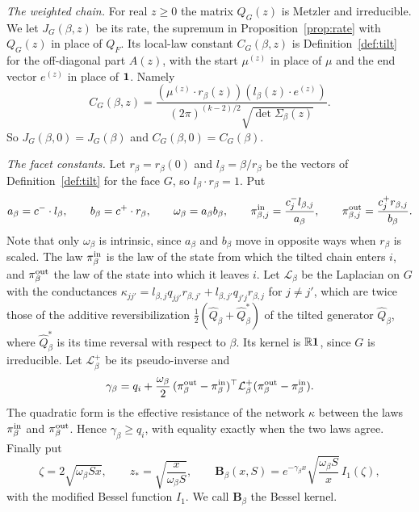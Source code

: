 \emph{The weighted chain.} For real $z\ge0$ the matrix $Q_G(z)$ is Metzler and irreducible.
We let $J_G(\beta,z)$ be its rate, the supremum in Proposition~\ref{prop:rate} with $Q_G(z)$
in place of $Q_F$. Its local-law constant $C_G(\beta,z)$ is Definition~\ref{def:tilt} for the
off-diagonal part $A(z)$, with the start $\mu^{(z)}$ in place of $\mu$ and the end vector
$e^{(z)}$ in place of $\mathbf{1}$. Namely
\[
C_G(\beta,z)=\frac{(\mu^{(z)}\cdot r_\beta(z))(l_\beta(z)\cdot e^{(z)})}{(2\pi)^{(k-2)/2}\sqrt{\det\Sigma_\beta(z)}} .
\]
So $J_G(\beta,0)=J_G(\beta)$ and $C_G(\beta,0)=C_G(\beta)$.

\emph{The facet constants.} Let $r_\beta=r_\beta(0)$ and $l_\beta=\beta/r_\beta$ be the vectors
of Definition~\ref{def:tilt} for the face $G$, so $l_\beta\cdot r_\beta=1$. Put
\[
a_\beta=c^-\cdot l_\beta,\qquad b_\beta=c^+\cdot r_\beta,\qquad \omega_\beta=a_\beta b_\beta,\qquad
\pi^{\rm in}_{\beta,j}=\frac{c^-_jl_{\beta,j}}{a_\beta},\qquad \pi^{\rm out}_{\beta,j}=\frac{c^+_jr_{\beta,j}}{b_\beta}.
\]
Note that only $\omega_\beta$ is intrinsic, since $a_\beta$ and $b_\beta$ move in opposite ways when
$r_\beta$ is scaled. The law $\pi^{\rm in}_\beta$ is the law of the state from which the
tilted chain enters $i$, and $\pi^{\rm out}_\beta$ the law of the state into which it leaves
$i$. Let $\mathcal L_\beta$ be the Laplacian on $G$ with the conductances
$\kappa_{jj'}=l_{\beta,j}q_{jj'}r_{\beta,j'}+l_{\beta,j'}q_{j'j}r_{\beta,j}$ for $j\ne j'$,
which are twice those of the additive reversibilization
$\frac12(\widehat Q_\beta+\widehat Q_\beta^*)$ of the tilted generator $\widehat Q_\beta$, where
$\widehat Q_\beta^*$ is its time reversal with respect to $\beta$. Its kernel is $\mathbb{R}\mathbf{1}$, since $G$ is irreducible. Let
$\mathcal L_\beta^+$ be its pseudo-inverse and
\begin{equation}\label{eq:layer-gamma}
\gamma_\beta=q_i+\frac{\omega_\beta}2\,(\pi^{\rm out}_\beta-\pi^{\rm in}_\beta)^\top\mathcal L_\beta^+(\pi^{\rm out}_\beta-\pi^{\rm in}_\beta).
\end{equation}
The quadratic form is the effective resistance of the network $\kappa$ between the laws
$\pi^{\rm in}_\beta$ and $\pi^{\rm out}_\beta$. Hence $\gamma_\beta\ge q_i$, with equality exactly
when the two laws agree. Finally put
\[
\zeta=2\sqrt{\omega_\beta Sx},\qquad z_*=\sqrt{\frac x{\omega_\beta S}},\qquad
\mathbf B_\beta(x,S)=e^{-\gamma_\beta x}\sqrt{\frac{\omega_\beta S}x}\,I_1(\zeta),
\]
with the modified Bessel function $I_1$. We call $\mathbf B_\beta$ the Bessel kernel.

